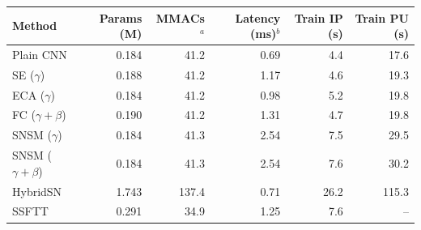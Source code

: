 \begin{tabular}{lrrrrr}
\toprule
Method & Params (M) & MMACs$^{a}$ & Latency (ms)$^{b}$ & Train IP (s) & Train PU (s) \\
\midrule
Plain CNN & 0.184 & 41.2 & 0.69 & 4.4 & 17.6 \\
SE ($\gamma$) & 0.188 & 41.2 & 1.17 & 4.6 & 19.3 \\
ECA ($\gamma$) & 0.184 & 41.2 & 0.98 & 5.2 & 19.8 \\
FC ($\gamma{+}\beta$) & 0.190 & 41.2 & 1.31 & 4.7 & 19.8 \\
SNSM ($\gamma$) & 0.184 & 41.3 & 2.54 & 7.5 & 29.5 \\
SNSM ($\gamma{+}\beta$) & 0.184 & 41.3 & 2.54 & 7.6 & 30.2 \\
HybridSN & 1.743 & 137.4 & 0.71 & 26.2 & 115.3 \\
SSFTT & 0.291 & 34.9 & 1.25 & 7.6 & -- \\
\bottomrule
\end{tabular}
